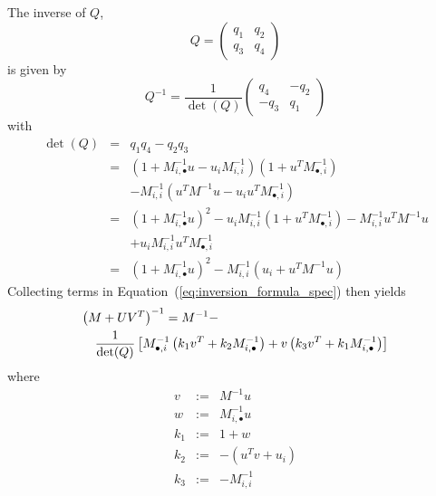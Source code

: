 \documentclass[a4paper]{article}
\begin{document}
The inverse of $Q$,
\begin{equation}
Q=
\left(
\begin{array}{cc}
q_{1} & q_{2} \\
q_{3} & q_{4}
\end{array}
\right)
\end{equation}
is given by
\begin{equation}
Q^{-1}=
\frac{1}{\det(Q)}
\left(
\begin{array}{cc}
q_{4}  & -q_{2} \\
-q_{3} &  q_{1}
\end{array}
\right)
\end{equation}
with
\begin{eqnarray}
\label{def:det_Q}
\det(Q)
&=&
q_{1}q_{4}-q_{2}q_{3}
\nonumber \\
&=&
\left(1+M_{i, \bullet}^{-1}u-u_{i}M_{i,i}^{-1}\right)
\left(1 + u^{T}M^{-1}_{\bullet, i}\right)
\nonumber \\
&&
-M_{i,i}^{-1}\left(u^{T}M^{-1}u-u_{i}u^{T}M_{\bullet,i}^{-1}\right)
\nonumber \\
&=&
\left(1+M_{i, \bullet}^{-1}u\right)^{2}
-u_{i}M_{i,i}^{-1}\left(1+u^{T}M_{\bullet,i}^{-1}\right)
-M_{i,i}^{-1}u^{T}M^{-1}u
\nonumber \\
&&
+ u_{i}M_{i,i}^{-1}u^{T}M_{\bullet,i}^{-1}
\nonumber \\
&=& \left(1+M_{i, \bullet}^{-1}u\right)^{2} -
    M_{i,i}^{-1}\left(u_{i}+ u^{T}M^{-1}u\right)
\end{eqnarray}
Collecting terms in Equation~(\ref{eq:inversion_formula_spec}) then yields
\begin{eqnarray}
\label{eq:inversion_formula_spec_explicit}
\lefteqn{\left(M+ UV^{T}\right)^{-1}=M^{-1} -} \nonumber \\
& & \frac{1}{\det(Q)}
\left[
  M^{-1}_{\bullet, i}
  \left(k_{1}v^{T} + k_{2}M^{-1}_{i, \bullet}\right)
  +v\left(k_{3}v^{T} + k_{1}M^{-1}_{i, \bullet}\right)
\right]
\end{eqnarray}
where
\begin{eqnarray}
\label{def:v}
v     &:=& M^{-1}u \\
\label{def:w}
w     &:=& M^{-1}_{i, \bullet}u \\
\label{def:k1}
k_{1} &:=& 1 + w \\
\label{def:k2}
k_{2} &:=& -\left(u^{T}v + u_{i}\right) \\
\label{def:k3}
k_{3} &:=& -M_{i,i}^{-1} 
\end{eqnarray}
\end{document}
